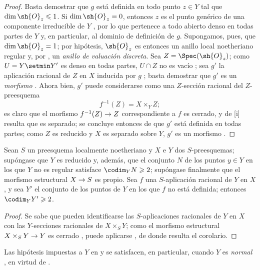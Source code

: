 \documentclass[oneside,10pt]{amsart}
\makeatletter
\renewcommand{\leq}{\leqslant}
\renewcommand{\geq}{\geqslant}
\newcommand{\ega@arrow}[2]{\mathchoice{#1}{#2}{#2}{#2}}
\renewcommand{\to}{\ega@arrow{\longrightarrow}{\rightarrow}}
\let\EGAOriginalLabel\label
\renewcommand{\label}[1]{\phantomsection\EGAOriginalLabel{#1}}
\makeatother
\begin{document}
\begin{proof}
Basta demostrar que $g$ está definida en todo punto $z\in Y$ tal que $\dim\sh{O}_z\leq1$.
Si $\dim\sh{O}_z=0$, entonces $z$ es el punto genérico de una componente irreducible de $Y$ , por lo que pertenece a todo abierto denso en todas partes de $Y$ y, en particular, al dominio de definición de $g$.
Supongamos, pues, que $\dim\sh{O}_z=1$;
por hipótesis, $\sh{O}_z$ es entonces un anillo local noetheriano regular y, por , un \emph{anillo de valuación discreta}.
Sea $Z=\Spec(\sh{O}_z)$;
como $U=Y\setmin Y'$ es denso en todas partes, $U\cap Z$ no es vacío ;
sea $g'$ la aplicación racional de $Z$ en $X$ inducida por $g$ ;
basta demostrar que $g'$ es un \emph{morfismo} .
Ahora bien, $g'$ puede considerarse como una $Z$-sección racional del $Z$-preesquema
\[
  f^{-1}(Z)=X\times_Y Z;
\]
es claro que el morfismo $f^{-1}(Z)\to Z$ correspondiente a $f$ es cerrado, y de [i] resulta que es separado;
se concluye entonces de  que $g'$ está definida en todas partes;
como $Z$ es reducido y $X$ es separado sobre $Y$, $g'$ es un morfismo .
\end{proof}


\begin{corollary}[7.3.6]
\label{II.7.3.6}
Sean $S$ un preesquema localmente noetheriano y $X$ e $Y$ dos $S$-preesquemas;
supóngase que $Y$ es reducido y, además, que el conjunto $N$ de los puntos $y\in Y$ en los que $Y$ no es regular satisface $\codim_Y N\geq2$;
supóngase finalmente que el morfismo estructural $X\to S$ es propio.
Sea $f$ una $S$-aplicación racional de $Y$ en $X$, y sea $Y'$ el conjunto de los puntos de $Y$ en los que $f$ no está definida;
entonces $\codim_Y Y'\geq2$.
\end{corollary}

\begin{proof}
Se sabe  que pueden identificarse las $S$-aplicaciones racionales de $Y$ en $X$ con las $Y$-secciones racionales de $X\times_S Y$;
como el morfismo estructural $X\times_S Y\to Y$ es cerrado , puede aplicarse , de donde resulta el corolario.
\end{proof}

\begin{remark}[7.3.7]
\label{II.7.3.7}
Las hipótesis impuestas a $Y$ en  y  se satisfacen, en particular, cuando $Y$ es \emph{normal} , en virtud de .
\end{remark}
\end{document}
